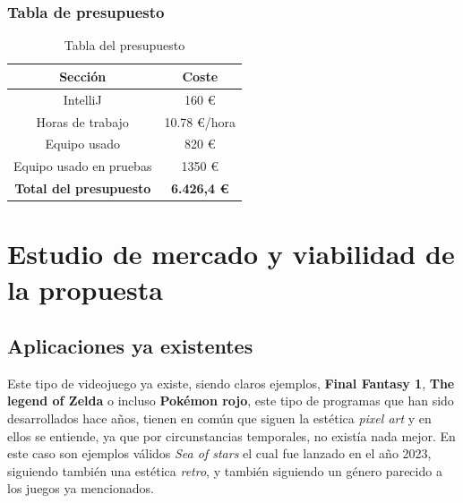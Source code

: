\documentclass[a4paper]{article}
\begin{document}
\subsubsection{Tabla de presupuesto}
\begin{table}[ht]
    \centering
    \begin{tabular}{|c|c|}
        \hline
        \textbf{Sección}               & \textbf{Coste}     \\
        \hline
        IntelliJ                       & 160 €              \\
        \hline
        Horas de trabajo               & 10.78 €/hora       \\
        \hline
        Equipo usado                   & 820 €              \\
        \hline
        Equipo usado en pruebas        & 1350 €             \\
        \hline
        \textbf{Total del presupuesto} & \textbf{6.426,4 €} \\
        \hline
    \end{tabular}
    \caption{Tabla del presupuesto}
    \label{tab:presupuesto-table}
\end{table}


\clearpage
\section{Estudio de mercado y viabilidad de la propuesta}
\subsection{Aplicaciones ya existentes}
Este tipo de videojuego ya existe, siendo claros ejemplos, \textbf{Final Fantasy 1}, \textbf{The legend of Zelda} o incluso \textbf{Pokémon rojo}, este tipo de
programas que han sido desarrollados hace años, tienen en común que siguen la estética \textit{pixel art} y en ellos se entiende, ya que por circunstancias temporales,
no existía nada mejor. En este caso son ejemplos válidos \textit{Sea of stars} el cual fue lanzado en el año 2023, siguiendo también una estética \textit{retro}, y también siguiendo
un género parecido a los juegos ya mencionados.
\end{document}
